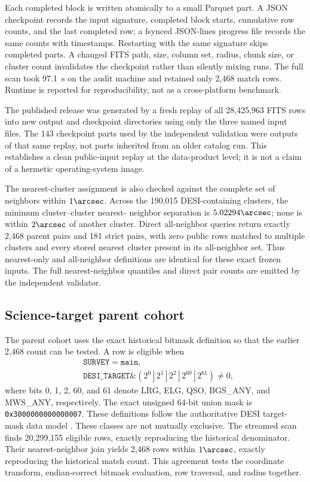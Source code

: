 \documentclass[twocolumn]{aastex701}
\begin{document}
Each completed block is written atomically to a small Parquet part.  A JSON checkpoint records
the input signature, completed block starts, cumulative row counts, and the last completed row;
a fsynced JSON-lines progress file records the same counts with timestamps.  Restarting with the
same signature skips completed parts.  A changed FITS path, size, column set, radius, chunk size,
or cluster count invalidates the checkpoint rather than silently mixing runs.  The full scan took
97.1~s on the audit machine and retained only 2,468 match rows.  Runtime is reported for
reproducibility, not as a cross-platform benchmark.

The published release was generated by a fresh replay of all 28,425,963 FITS rows into new output
and checkpoint directories using only the three named input files.  The 143 checkpoint parts used
by the independent validation were outputs of that same replay, not parts inherited from an older
catalog run.  This establishes a clean public-input replay at the data-product level; it is not a
claim of a hermetic operating-system image.

The nearest-cluster assignment is also checked against the complete set of neighbors within
$1\arcsec$.  Across the 190,015 DESI-containing clusters, the minimum cluster--cluster nearest-
neighbor separation is $5.02294\arcsec$; none is within $2\arcsec$ of another cluster.  Direct
all-neighbor queries return exactly 2,468 parent pairs and 181 strict pairs, with zero public rows
matched to multiple clusters and every stored nearest cluster present in its all-neighbor set.
Thus nearest-only and all-neighbor definitions are identical for these exact frozen inputs.  The
full nearest-neighbor quantiles and direct pair counts are emitted by the independent validator.

\subsection{Science-target parent cohort}\label{sec:parent-selection}

The parent cohort uses the exact historical bitmask definition so that the earlier 2,468 count
can be tested.  A row is eligible when
\begin{equation}
\begin{split}
&\texttt{SURVEY}=\texttt{main},\\
&\texttt{DESI\_TARGET}\mathbin{\&}
\left(2^0\,|\,2^1\,|\,2^2\,|\,2^{60}\,|\,2^{61}\right)\ne0,
\end{split}
\end{equation}
where bits 0, 1, 2, 60, and 61 denote LRG, ELG, QSO, BGS\_ANY, and MWS\_ANY, respectively.
The exact unsigned 64-bit union mask is \texttt{0x3000000000000007}.
These definitions follow the authoritative DESI target-mask data model \citep{DESIBitmasks}.
These classes are not mutually exclusive.  The streamed scan finds 20,299,155 eligible rows,
exactly reproducing the historical denominator.  Their nearest-neighbor join yields 2,468 rows
within $1\arcsec$, exactly reproducing the historical match count.  This agreement tests the
coordinate transform, endian-correct bitmask evaluation, row traversal, and radius together.
\end{document}
